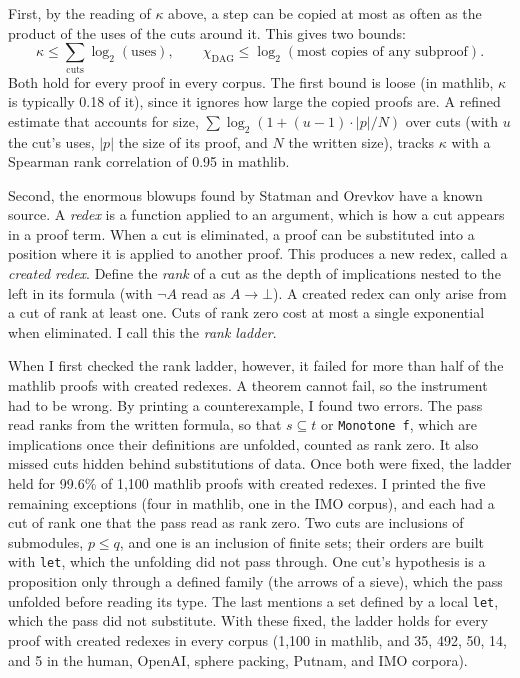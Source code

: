 \documentclass{article}
\begin{document}
First, by the reading of $\kappa$ above, a step can be copied at most as often as the product of the uses of the cuts
around it. This gives two bounds:
\[
\kappa\leq\sum_{\text{cuts}}\log_2(\text{uses}),
\qquad
\chi_{\mathrm{DAG}}\leq\log_2(\text{most copies of any subproof}).
\]
Both hold for every proof in every corpus. The first bound is loose (in mathlib, $\kappa$ is typically 0.18 of it),
since it ignores how large the copied proofs are. A refined estimate that accounts for size,
$\sum\log_2(1+(u-1)\cdot|p|/N)$ over cuts (with $u$ the cut's uses, $|p|$ the size of its proof, and $N$ the written
size), tracks $\kappa$ with a Spearman rank correlation \textit{\parencite{spearman1904}} of 0.95 in mathlib.

Second, the enormous blowups found by Statman and Orevkov have a known source. A \textit{redex} is a function applied to an argument, which is how a cut appears in a proof term. When a cut is
eliminated, a proof can be substituted into a position where it is applied to another proof. This produces a new
redex, called a \textit{created redex}. Define the \textit{rank} of a cut as the depth of implications nested to the left in
its formula (with $\neg A$ read as $A\to\bot$). A created redex can only arise from a cut of rank at least one. Cuts of
rank zero cost at most a single exponential when eliminated. I call this the \textit{rank ladder}.

When I first checked the rank ladder, however, it failed for more than half of the mathlib
proofs with created redexes. A theorem cannot fail, so the instrument had to be wrong. By printing a counterexample, I
found two errors. The pass read ranks from the written formula, so that $s\subseteq t$ or \texttt{Monotone f}, which are
implications once their definitions are unfolded, counted as rank zero. It also missed cuts hidden behind
substitutions of data. Once both were fixed, the ladder held for 99.6\% of 1,100 mathlib proofs with created redexes.
I printed the five remaining exceptions (four in mathlib, one in the IMO corpus), and each had a cut of rank one that the
pass read as rank zero. Two cuts are inclusions of submodules, $p\leq q$, and one is an inclusion of finite sets; their
orders are built with \texttt{let}, which the unfolding did not pass through. One cut's hypothesis is a proposition
only through a defined family (the arrows of a sieve), which the pass unfolded before reading its type. The last
mentions a set defined by a local \texttt{let}, which the pass did not substitute. With these fixed, the ladder holds for
every proof with created redexes in every corpus (1,100 in mathlib, and 35, 492, 50, 14, and 5 in the human, OpenAI,
sphere packing, Putnam, and IMO corpora).
\end{document}
